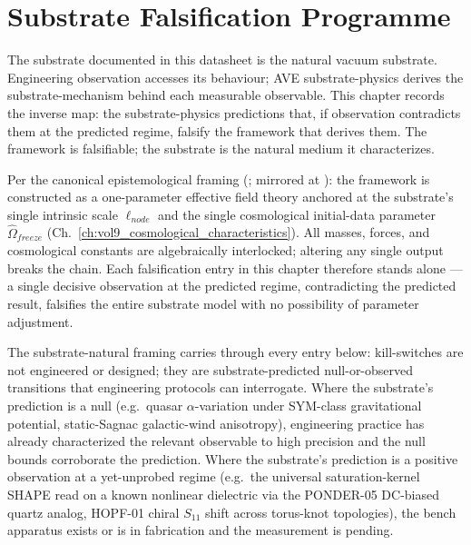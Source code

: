 \section{Substrate Falsification Programme}
\label{sec:vol9_falsification_programme}

The substrate documented in this datasheet is the natural vacuum substrate. Engineering observation accesses its behaviour; AVE substrate-physics derives the substrate-mechanism behind each measurable observable. This chapter records the inverse map: the substrate-physics predictions that, if observation contradicts them at the predicted regime, falsify the framework that derives them. The framework is falsifiable; the substrate is the natural medium it characterizes.

Per the canonical epistemological framing (; mirrored at ): the framework is constructed as a one-parameter effective field theory anchored at the substrate's single intrinsic scale $\ell_{node}$ and the single cosmological initial-data parameter $\hat{\Omega}_{freeze}$ (Ch.~\ref{ch:vol9_cosmological_characteristics}). All masses, forces, and cosmological constants are algebraically interlocked; altering any single output breaks the chain. Each falsification entry in this chapter therefore stands alone --- a single decisive observation at the predicted regime, contradicting the predicted result, falsifies the entire substrate model with no possibility of parameter adjustment.

The substrate-natural framing carries through every entry below: kill-switches are not engineered or designed; they are substrate-predicted null-or-observed transitions that engineering protocols can interrogate. Where the substrate's prediction is a null (e.g.\ quasar $\alpha$-variation under SYM-class gravitational potential, static-Sagnac galactic-wind anisotropy), engineering practice has already characterized the relevant observable to high precision and the null bounds corroborate the prediction. Where the substrate's prediction is a positive observation at a yet-unprobed regime (e.g.\ the universal saturation-kernel SHAPE read on a known nonlinear dielectric via the PONDER-05 DC-biased quartz analog, HOPF-01 chiral $S_{11}$ shift across torus-knot topologies), the bench apparatus exists or is in fabrication and the measurement is pending.

